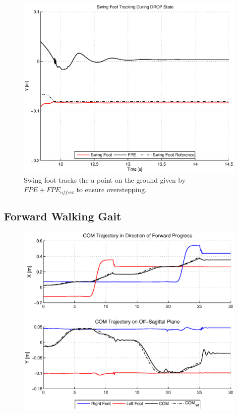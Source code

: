 \begin{figure}[!h]
	\centering
    \includegraphics[scale=0.6]{fig/simulations/sidefpetrack.eps}
  	\caption{Swing foot tracks the a point on the ground given by $FPE + FPE_{offset}$ to ensure overstepping.}
	\label{fig:sidefpetrack}
\end{figure}


\subsection{Forward Walking Gait} %
\label{sub:forward_walking_gait}
\Incomplete 

\begin{figure}[!h]
	\centering
    \includegraphics[scale=0.6]{fig/simulations/fwdcomtraj.eps}
  	\caption{\Incomplete}
	\label{fig:fwdcomtraj}
\end{figure}

